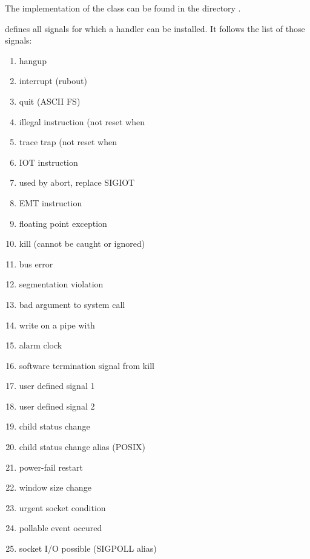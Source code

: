 The implementation of the class  can be found in the directory
.


 defines all signals for which a handler can be installed.  It
follows the list of those signals:
\begin{enumerate}
 \item {} hangup
 \item {} interrupt (rubout)
 \item {} quit (ASCII FS)
 \item {} illegal instruction (not reset when
 \item {} trace trap (not reset when
 \item {} IOT instruction
 \item {} used by abort, replace SIGIOT
 \item {} EMT instruction
 \item {} floating point exception
 \item {} kill (cannot be caught or ignored)
 \item {} bus error
 \item {} segmentation violation
 \item {} bad argument to system call
 \item {} write on a pipe with
 \item {} alarm clock
 \item {} software termination signal from kill
 \item {} user defined signal 1
 \item {} user defined signal 2
 \item {} child status change
 \item {} child status change alias (POSIX)
 \item {} power-fail restart
 \item {} window size change
 \item {} urgent socket condition
 \item {} pollable event occured
 \item {} socket I/O possible (SIGPOLL alias)

\end{enumerate}
